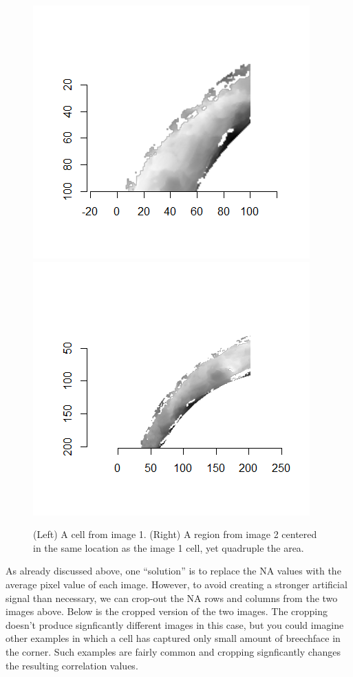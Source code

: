 \documentclass[]{book}
\begin{document}
\begin{figure}

{\centering \includegraphics[width=0.5\linewidth]{images/cartridge_cases/im1_split} \includegraphics[width=0.5\linewidth]{images/cartridge_cases/im2_split} 

}

\caption{(Left) A cell from image 1. (Right) A region from image 2 centered in the same location as the image 1 cell, yet quadruple the area.}\label{fig:unnamed-chunk-16}
\end{figure}

As already discussed above, one ``solution'' is to replace the NA values with the average pixel value of each image. However, to avoid creating a stronger artificial signal than necessary, we can crop-out the NA rows and columns from the two images above. Below is the cropped version of the two images. The cropping doesn't produce signficantly different images in this case, but you could imagine other examples in which a cell has captured only small amount of breechface in the corner. Such examples are fairly common and cropping signficantly changes the resulting correlation values.
\end{document}

